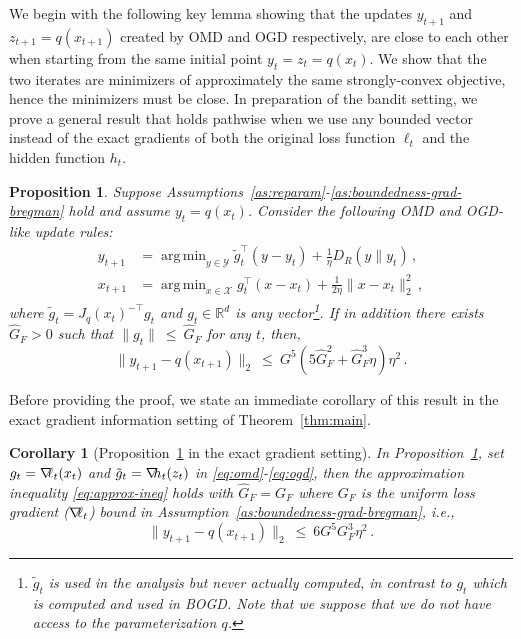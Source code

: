 \documentclass[a4paper,11pt,fullpage]{article}
\def\X{{\mathcal X}}
\def\Y{{\mathcal Y}}
\theoremstyle{plain}
\newtheorem{corollary}[theorem]{Corollary}
\newtheorem{proposition}{Proposition}
\theoremstyle{definition}
\theoremstyle{plain}
\DeclareMathOperator*{\argmin}{arg\,min}
\renewcommand{\leq}{~\le~}
\let\nablaold\nabla
\renewcommand{\nabla}{\nablaold\mkern-2.5mu}
\begin{document}
We begin with the following key lemma showing that the updates $y_{t+1}$ and $z_{t+1} = q(x_{t+1})$ created by OMD and OGD respectively, are close to each other when starting from the same initial point $y_t= z_t = q(x_t)$. We show that the two iterates are minimizers of approximately the same strongly-convex objective, hence the minimizers must be close. 
In preparation of the bandit setting, we prove a general result that holds pathwise when we use any bounded vector instead of the exact gradients of both the original loss function $\ell_t$ and the hidden function $h_t.$ 

\begin{tcolorbox}[colframe=white!, top=2pt,left=2pt,right=2pt,bottom=2pt] 
\begin{proposition}\label{prop:dist-minimizers-eta2}
Suppose Assumptions~\ref{as:reparam}-\ref{as:boundedness-grad-bregman} hold and assume $y_t= q(x_t)$.
Consider the following OMD and OGD-like update rules: 
\begin{align}
y_{t+1}&=\argmin_{y\in \Y} \tilde{g}_t^{\top}(y-y_t) +\frac{1}{\eta} D_R(y\|y_t)\,, \label{eq:omd}\\
x_{t+1}&=\argmin_{x\in \X} g_t^{\top}(x-x_t) +\frac{1}{2\eta} \|x-x_t\|_2^2 \label{eq:ogd}\,, 
\end{align}
where $\tilde{g}_t = J_q(x_t)^{-\top} g_t$ and $g_t \in \mathbb{R}^d$ is any vector\footnote{$\tilde{g}_t$ is used in the analysis but never actually computed, in contrast to $g_t$ which is computed and used in BOGD. Note that we suppose that we do not have access to the parameterization $q$.}. If in addition there exists $\hat{G}_F > 0$ such that $\|g_t\| \leq \hat{G}_F$ for any $t$, then,  
\begin{equation}
\label{eq:approx-ineq}
    \|y_{t+1}-q(x_{t+1})\|_2 \leq G^5 (5\hat{G}_F^2 + \hat{G}_F^3 \eta) \eta^2\,.
\end{equation} 
\end{proposition}
\end{tcolorbox}

Before providing the proof, we state an immediate corollary of this result in the exact gradient information setting of Theorem~\ref{thm:main}. 

\begin{tcolorbox}[colframe=white!, top=2pt,left=2pt,right=2pt,bottom=2pt] 
\begin{corollary}[Proposition~\ref{prop:dist-minimizers-eta2} in the exact gradient setting]
\label{cor:approx-lemma-det}
In Proposition~\ref{prop:dist-minimizers-eta2}, set $g_t = \nabla \ell_t(x_t)$ and $\tilde{g}_t = \nabla h_t(z_t)$ in \eqref{eq:omd}-\eqref{eq:ogd}, then the approximation inequality \eqref{eq:approx-ineq} holds with $\hat{G}_F = G_F$ where $G_F$ is the uniform loss gradient ($\nabla \ell_t$) bound in Assumption~\ref{as:boundedness-grad-bregman}, i.e., 
\begin{equation*}
\|y_{t+1}-q(x_{t+1})\|_2 \leq 6 G^5 G_F^3 \eta^2\,.
\end{equation*}
\end{corollary}
\end{tcolorbox}
\end{document}
